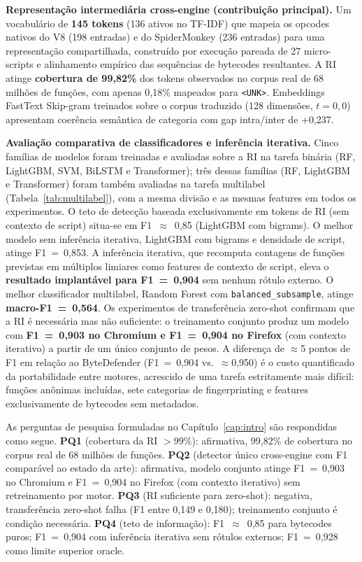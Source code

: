 \textbf{Representação intermediária cross-engine (contribuição principal).} Um
vocabulário de \textbf{145 tokens} (136 ativos no TF-IDF) que mapeia os opcodes nativos do V8 (198
entradas) e do SpiderMonkey (236 entradas) para uma representação compartilhada,
construído por execução pareada de 27 micro-scripts e alinhamento empírico das
sequências de bytecodes resultantes. A RI atinge \textbf{cobertura de 99,82\%} dos
tokens observados no corpus real de 68 milhões de funções, com apenas 0,18\%
mapeados para \texttt{<UNK>}. Embeddings FastText Skip-gram treinados sobre o corpus
traduzido (128 dimensões, $t=0{,}0$) apresentam coerência semântica de categoria com
gap intra/inter de +0,237.

\textbf{Avaliação comparativa de classificadores e inferência iterativa.} Cinco
famílias de modelos foram treinadas e avaliadas sobre a RI na tarefa binária
(RF, LightGBM, SVM, BiLSTM e Transformer); três dessas famílias (RF, LightGBM
e Transformer) foram também avaliadas na tarefa multilabel
(Tabela~\ref{tab:multilabel}), com a mesma divisão e as mesmas features em
todos os experimentos.
O teto de detecção baseada exclusivamente em tokens de RI (sem contexto de script)
situa-se em F1~$\approx$~0,85 (LightGBM com bigrams). O melhor
modelo sem inferência iterativa, LightGBM com bigrams e densidade de script, atinge
F1~=~0,853. A inferência iterativa, que recomputa contagens de funções
previstas em múltiplos limiares como features de contexto de script, eleva o
\textbf{resultado implantável para F1~=~0,904} sem nenhum rótulo externo. O melhor classificador multilabel, Random Forest com
\texttt{balanced\_subsample}, atinge \textbf{macro-F1~=~0,564}. Os experimentos
de transferência zero-shot confirmam que a RI é necessária mas não suficiente: o
treinamento conjunto produz um modelo com \textbf{F1~=~0,903 no Chromium e
F1~=~0,904 no Firefox} (com contexto iterativo) a partir de um único conjunto de
pesos. A diferença de
$\approx$5 pontos de F1 em relação ao ByteDefender (F1~=~0,904 vs.\
$\approx$0,950) é o custo quantificado da portabilidade entre motores, acrescido de uma tarefa estritamente mais difícil: funções anônimas incluídas,
sete categorias de fingerprinting e features exclusivamente de bytecodes
sem metadados.

As perguntas de pesquisa formuladas no Capítulo~\ref{cap:intro} são respondidas
como segue. \textbf{PQ1} (cobertura da RI $>99\%$): afirmativa, 99,82\% de
cobertura no corpus real de 68 milhões de funções. \textbf{PQ2} (detector único
cross-engine com F1 comparável ao estado da arte): afirmativa, modelo conjunto
atinge F1~=~0,903 no Chromium e F1~=~0,904 no Firefox (com contexto iterativo) sem retreinamento por motor.
\textbf{PQ3} (RI suficiente para zero-shot): negativa, transferência zero-shot
falha (F1 entre 0,149 e 0,180); treinamento conjunto é condição necessária.
\textbf{PQ4} (teto de informação): F1~$\approx$~0,85 para bytecodes puros;
F1~=~0,904 com inferência iterativa sem rótulos externos; F1~=~0,928 como limite
superior oracle.

